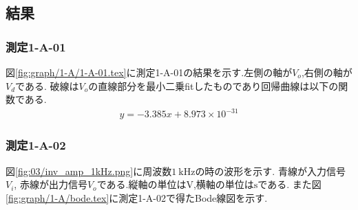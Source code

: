 \subsection{結果}
\subsubsection{測定1-A-01}
図\ref{fig:graph/1-A/1-A-01.tex}に測定1-A-01の結果を示す.左側の軸が$V_o$,右側の軸が$V_d$である.
破線は$V_o$の直線部分を最小二乗fitしたものであり回帰曲線は以下の関数である.
\begin{align}
  \label{equ:inv_amp_gain}
  y=-3.385x+8.973\times10^{-31}
\end{align}
\clearpage
\subsubsection{測定1-A-02}
図\ref{fig:03/inv_amp_1kHz.png}に周波数$1\ \si{\kilo\hertz}$の時の波形を示す.
青線が入力信号$V_i$, 赤線が出力信号$V_o$である.縦軸の単位は$\si{\volt}$,横軸の単位は$\si{\second}$である.
また図\ref{fig:graph/1-A/bode.tex}に測定1-A-02で得たBode線図を示す.
